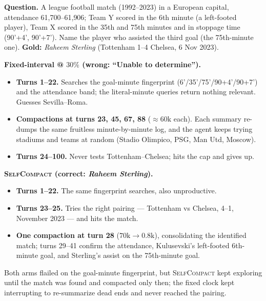 \documentclass{article}
\newcommand{\method}{\textsc{{SelfCompact}}}
\begin{document}
\begin{casebox}[title={Case~C: Raheem Sterling --- fixed-interval never reaches the match}]
\textbf{Question.} A league football match (1992--2023) in a European capital,
attendance 61{,}700--61{,}906; Team Y scored in the 6th minute (a left-footed
player), Team X scored in the 35th and 75th minutes and in stoppage time
(90'+4', 90'+7'). Name the player who assisted the third goal (the
75th-minute one). \textbf{Gold:} \emph{Raheem Sterling} (Tottenham 1--4
Chelsea, 6 Nov 2023).
 
\textbf{Fixed-interval @ $30\%$ (wrong: ``Unable to determine'').}
\begin{itemize}[leftmargin=*]\setlength\itemsep{1pt}
\item \textbf{Turns 1--22.} Searches the goal-minute fingerprint
(6'/35'/75'/90+4'/90+7') and the attendance band; the literal-minute queries
return nothing relevant. Guesses Sevilla--Roma.
\item \textbf{Compactions at turns 23, 45, 67, 88} (${\approx}60\mathrm{k}$ each).
Each summary re-dumps the same fruitless minute-by-minute log, and the agent
keeps trying stadiums and teams at random (Stadio Olimpico, PSG, Man Utd, Moscow).
\item \textbf{Turns 24--100.} Never tests Tottenham--Chelsea; hits the cap and
gives up.
\end{itemize}
\textbf{\method{} (correct: \emph{Raheem Sterling}).}
\begin{itemize}[leftmargin=*]\setlength\itemsep{1pt}
\item \textbf{Turns 1--22.} The same fingerprint searches, also unproductive.
\item \textbf{Turns 23--25.} Tries the right pairing --- Tottenham vs Chelsea,
4--1, November 2023 --- and hits the match.
\item \textbf{One compaction at turn 28} ($70\mathrm{k}\to0.8\mathrm{k}$),
consolidating the identified match; turns 29--41 confirm the attendance,
Kulusevski's left-footed 6th-minute goal, and Sterling's assist on the
75th-minute goal.
\end{itemize}
Both arms flailed on the goal-minute fingerprint, but \method{} kept exploring
until the match was found and compacted only then; the fixed clock kept
interrupting to re-summarize dead ends and never reached the pairing.
\end{casebox}

\clearpage
%
\end{document}
